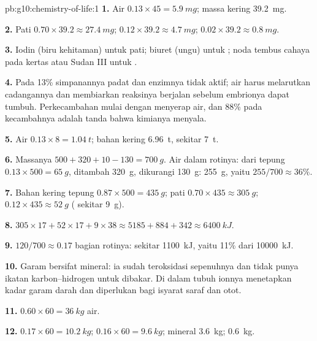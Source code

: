 \begin{solution}{pb:g10:chemistry-of-life:1}
\textbf{1.} Air $0.13 \times 45 = \qty{5.9}{mg}$; massa kering
\qty{39.2}{mg}.

\textbf{2.} Pati $0.70 \times 39.2 \approx \qty{27.4}{mg}$; 
$0.12 \times 39.2 \approx \qty{4.7}{mg}$;  $0.02 \times 39.2
\approx \qty{0.8}{mg}$.

\textbf{3.} Iodin (biru kehitaman) untuk pati; biuret (ungu) untuk
; noda tembus cahaya pada kertas atau Sudan III untuk .

\textbf{4.} Pada 13\% simpanannya padat dan enzimnya tidak aktif; air
harus melarutkan cadangannya dan membiarkan reaksinya berjalan sebelum
embrionya dapat tumbuh. Perkecambahan mulai dengan menyerap air, dan
88\% pada kecambahnya adalah tanda bahwa kimianya menyala.

\textbf{5.} Air $0.13 \times 8 = \qty{1.04}{t}$; bahan kering
\qty{6.96}{t}, sekitar \qty{7}{t}.

\textbf{6.} Massanya $500 + 320 + 10 - 130 = \qty{700}{g}$. Air dalam
rotinya: dari tepung $0.13 \times 500 = \qty{65}{g}$, ditambah \qty{320}{g},
dikurangi \qty{130}{g}: \qty{255}{g}, yaitu $255/700 \approx 36\%$.

\textbf{7.} Bahan kering tepung $0.87 \times 500 = \qty{435}{g}$; pati
$0.70 \times 435 \approx \qty{305}{g}$;  $0.12 \times 435 \approx
\qty{52}{g}$ ( sekitar \qty{9}{g}).

\textbf{8.} $305 \times 17 + 52 \times 17 + 9 \times 38 \approx 5185 +
884 + 342 \approx \qty{6400}{kJ}$.

\textbf{9.} $120/700 \approx 0.17$ bagian rotinya: sekitar \qty{1100}{kJ},
yaitu 11\% dari \qty{10000}{kJ}.

\textbf{10.} Garam bersifat mineral: ia sudah teroksidasi sepenuhnya
dan tidak punya ikatan karbon--hidrogen untuk dibakar. Di dalam tubuh
ionnya menetapkan kadar garam darah dan diperlukan bagi isyarat saraf
dan otot.

\textbf{11.} $0.60 \times 60 = \qty{36}{kg}$ air.

\textbf{12.}  $0.17 \times 60 = \qty{10.2}{kg}$;  $0.16
\times 60 = \qty{9.6}{kg}$; mineral \qty{3.6}{kg}; 
\qty{0.6}{kg}.


\end{solution}
